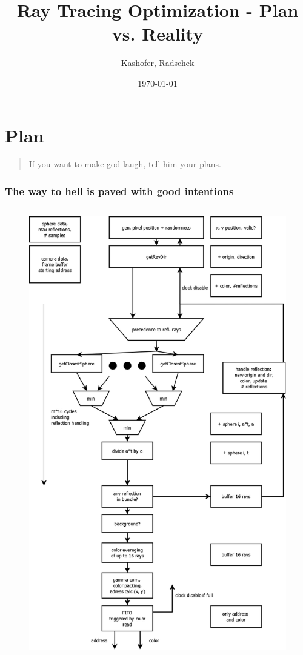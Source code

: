\documentclass{beamer}
\title{Ray Tracing Optimization - Plan vs. Reality}
\author{Kashofer, Radschek}
\date{\today}
\begin{document}
\maketitle
\frame{\tableofcontents[currentsection]}
 
\section{Plan}
\begin{frame}
	\begin{quote}If you want to make god laugh, tell him your plans.\end{quote}
\end{frame}
\begin{frame} %
	\frametitle{The way to hell is paved with good intentions} %
	\begin{columns}
	\begin{column}{0.5\textwidth}
  	\begin{figure}
		\includegraphics[height=0.8\textheight]{pics/pipe.png}

\end{figure}
\end{column}
\end{columns}
\end{frame}
\end{document}
